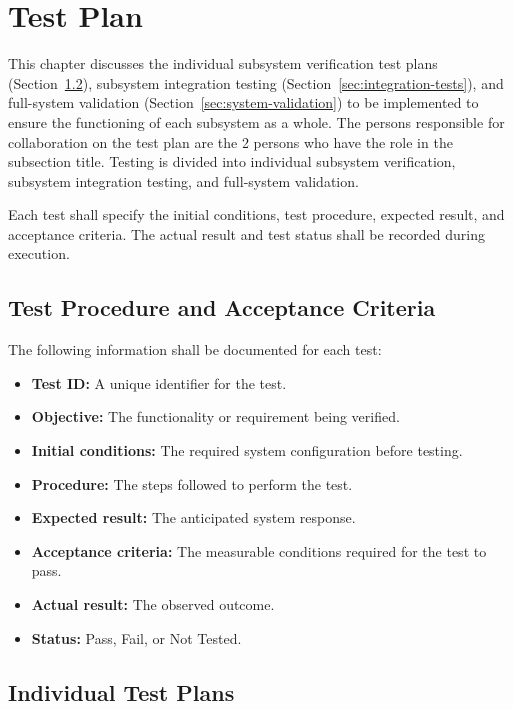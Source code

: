 \chapter{Test Plan}
\label{ch:test-plan}
This chapter discusses the individual subsystem verification test plans (Section~\ref{sec:individual-tests}), subsystem integration testing (Section~\ref{sec:integration-tests}), and full-system validation (Section~\ref{sec:system-validation}) to be implemented to ensure the functioning of each subsystem as a whole. The persons responsible for collaboration on the test plan are the 2 persons who have the role in the subsection title. Testing is divided into individual subsystem verification,
subsystem integration testing, and full-system validation.

Each test shall specify the initial conditions, test procedure,
expected result, and acceptance criteria. The actual result and
test status shall be recorded during execution.

\section{Test Procedure and Acceptance Criteria}
The following information shall be documented for each test:
\begin{itemize}
    \item \textbf{Test ID:} A unique identifier for the test.
    \item \textbf{Objective:} The functionality or requirement
    being verified.
    \item \textbf{Initial conditions:} The required system
    configuration before testing.
    \item \textbf{Procedure:} The steps followed to perform the test.
    \item \textbf{Expected result:} The anticipated system response.
    \item \textbf{Acceptance criteria:} The measurable conditions
    required for the test to pass.
    \item \textbf{Actual result:} The observed outcome.
    \item \textbf{Status:} Pass, Fail, or Not Tested.
\end{itemize}

\section{Individual Test Plans}
\label{sec:individual-tests}

